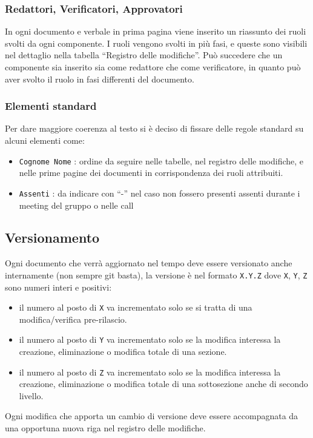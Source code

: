 \subsubsection{Redattori, Verificatori, Approvatori}
In ogni documento e verbale in prima pagina viene inserito un riassunto dei ruoli svolti da ogni componente. I ruoli vengono svolti in più fasi, e queste sono visibili nel dettaglio nella tabella ``Registro delle modifiche''. Può succedere che un componente sia inserito sia come redattore che come verificatore, in quanto può aver svolto il ruolo in fasi differenti del documento.

\subsubsection{Elementi standard}
Per dare maggiore coerenza al testo si è deciso di fissare delle regole standard su alcuni elementi come:
\begin{itemize}
	\item \texttt{Cognome Nome} : ordine da seguire nelle tabelle, nel registro delle modifiche, e nelle prime pagine dei documenti in corrispondenza dei ruoli attribuiti.
	\item \texttt{Assenti} : da indicare con ``-'' nel caso non fossero presenti assenti durante i meeting del gruppo o nelle call
\end{itemize}

\subsection{Versionamento}
Ogni documento che verrà aggiornato nel tempo deve essere versionato anche
internamente (non sempre git basta), la versione è nel formato \texttt{X.Y.Z} dove
\texttt{X}, \texttt{Y}, \texttt{Z} sono numeri interi e positivi:
\begin{itemize}
    \item il numero al posto di \texttt{X} va incrementato solo se si tratta di una
    modifica/verifica pre-rilascio.
    \item il numero al posto di \texttt{Y} va incrementato solo se la modifica
    interessa la creazione, eliminazione o modifica totale di una sezione.
    \item il numero al posto di \texttt{Z} va incrementato solo se la modifica
    interessa la creazione, eliminazione o modifica totale di una sottosezione
    anche di secondo livello.
\end{itemize}
Ogni modifica che apporta un cambio di versione deve essere accompagnata da una
opportuna nuova riga nel registro delle modifiche.
\\

